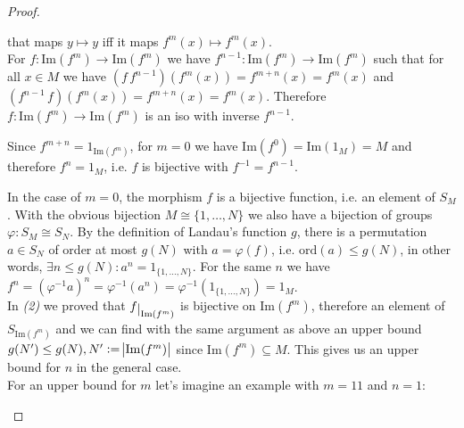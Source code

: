 \begin{proof}[Proof\nopunct]
\begin{subproof}[Proof of (2).]
that maps $y \mapsto y$ iff it maps $f^{m}(x) \mapsto f^{m}(x)$.\\
For $f : \mathrm{Im}(f^{m}) \rightarrow \mathrm{Im}(f^{m})$ we have
$f^{n-1} : \mathrm{Im}(f^{m}) \rightarrow \mathrm{Im}(f^{m})$ such that for all
$x \in M$ we have $(f\,f^{n-1})(f^{m}(x)) = f^{m+n}(x) = f^{m}(x)$ and
$(f^{n-1}\,f)(f^{m}(x)) = f^{m+n}(x) = f^{m}(x)$. Therefore $f : \mathrm{Im}(f^{m}) \rightarrow \mathrm{Im}(f^{m})$
is an iso with inverse $f^{n-1}$.
\end{subproof}
\begin{subproof}[Proof of (3).]
Since $f^{m+n} = 1_{\mathrm{Im}(f^{m})}$, for $m = 0$ we have
$\mathrm{Im}(f^{0}) = \mathrm{Im}(1_{M}) = M$ and therefore
$f^{n} = 1_{M}$, i.e. $f$ is bijective with $f^{-1} = f^{n-1}$.
\end{subproof}
\begin{subproof}[Proof of (4).]
In the case of $m = 0$, the morphism $f$ is a bijective function, i.e. an element of $S_{M}$. With the obvious
bijection $M \cong \{1,\dots,N\}$ we also have a bijection of groups $\varphi : S_{M} \cong S_{N}$. By the definition
of Landau's function $g$, there is a permutation $a \in S_{N}$ of order at most $g(N)$ with $a = \varphi(f)$, i.e.
$\mathrm{ord}(a) \leq g(N)$, in other words, $\exists n\leq g(N) : a^{n} = 1_{\{1,\dots,N\}}$. For the same $n$ we have
$f^{n} = (\varphi^{-1}a)^{n} = \varphi^{-1}(a^{n}) = \varphi^{-1}(1_{\{1,\dots,N\}}) = 1_{M}$.\\
In \textit{(2)} we proved that $f\restrict{\mathrm{Im}(f^{m})}$ is bijective on $\mathrm{Im}(f^{m})$, therefore an element of
$S_{\mathrm{Im}(f^{m})}$ and we can find with the same argument as above an upper bound $g(N') \leq g(N), N' := \abs{\mathrm{Im}(f^{m})}$
since $\mathrm{Im}(f^{m}) \subseteq M$. This gives us an upper bound for $n$ in the general case.\\
For an upper bound for $m$ let's imagine an example with $m=11$ and $n=1$:\\

\end{subproof}
\end{proof}
